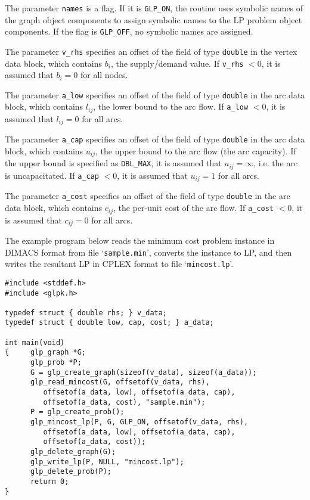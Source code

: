 \documentclass[11pt]{report}
\def\para#1{\noindent{\bf#1}}
\begin{document}
The parameter \verb|names| is a flag. If it is \verb|GLP_ON|, the
routine uses symbolic names of the graph object components to assign
symbolic names to the LP problem object components. If the flag is
\verb|GLP_OFF|, no symbolic names are assigned.

The parameter \verb|v_rhs| specifies an offset of the field of type
\verb|double| in the vertex data block, which contains $b_i$, the
supply/demand value. If \verb|v_rhs| $<0$, it is assumed that $b_i=0$
for all nodes.

The parameter \verb|a_low| specifies an offset of the field of type
\verb|double| in the arc data block, which contains $l_{ij}$, the lower
bound to the arc flow. If \verb|a_low| $<0$, it is assumed that
$l_{ij}=0$ for all arcs.

The parameter \verb|a_cap| specifies an offset of the field of type
\verb|double| in the arc data block, which contains $u_{ij}$, the upper
bound to the arc flow (the arc capacity). If the upper bound is
specified as \verb|DBL_MAX|, it is assumed that $u_{ij}=\infty$, i.e.
the arc is uncapacitated. If \verb|a_cap| $<0$, it is assumed that
$u_{ij}=1$ for all arcs.

The parameter \verb|a_cost| specifies an offset of the field of type
\verb|double| in the arc data block, which contains $c_{ij}$, the
per-unit cost of the arc flow. If \verb|a_cost| $<0$, it is assumed that
$c_{ij}=0$ for all arcs.

\para{Example}

The example program below reads the minimum cost problem instance in
DIMACS format from file `\verb|sample.min|', converts the instance to
LP, and then writes the resultant LP in CPLEX format to file
`\verb|mincost.lp|'.

\begin{footnotesize}
\begin{verbatim}
#include <stddef.h>
#include <glpk.h>

typedef struct { double rhs; } v_data;
typedef struct { double low, cap, cost; } a_data;

int main(void)
{     glp_graph *G;
      glp_prob *P;
      G = glp_create_graph(sizeof(v_data), sizeof(a_data));
      glp_read_mincost(G, offsetof(v_data, rhs),
         offsetof(a_data, low), offsetof(a_data, cap),
         offsetof(a_data, cost), "sample.min");
      P = glp_create_prob();
      glp_mincost_lp(P, G, GLP_ON, offsetof(v_data, rhs),
         offsetof(a_data, low), offsetof(a_data, cap),
         offsetof(a_data, cost));
      glp_delete_graph(G);
      glp_write_lp(P, NULL, "mincost.lp");
      glp_delete_prob(P);
      return 0;
}
\end{verbatim}
\end{footnotesize}
\end{document}
